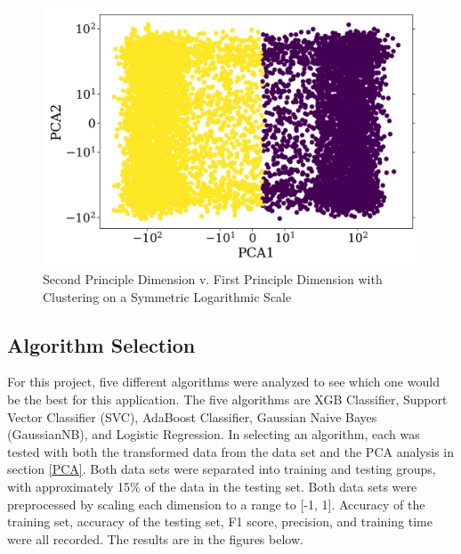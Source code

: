\documentclass{article}
\begin{document}
\begin{figure}[H]
\centering
\includegraphics[scale=0.59]{SecondCluster.png}%
\caption{Second Principle Dimension v. First Principle Dimension with Clustering on a Symmetric Logarithmic Scale}
\label{fig:SecondCluster}
\end{figure}

\subsection{Algorithm Selection} \label{algorithm_selection}
For this project, five different algorithms were analyzed to see which one would be the best for this application. The five algorithms are XGB Classifier, Support Vector Classifier (SVC), AdaBoost Classifier, Gaussian Naive Bayes (GaussianNB), and Logistic Regression. In selecting an algorithm, each was tested with both the transformed data from the data set and the PCA analysis in section \ref{PCA}. Both data sets were separated into training and testing groups, with approximately 15\% of the data in the testing set. Both data sets were preprocessed by scaling each dimension to a range to [-1, 1]. Accuracy of the training set, accuracy of the testing set, F1 score, precision, and training time were all recorded. The results are in the figures below. %

\end{document}

